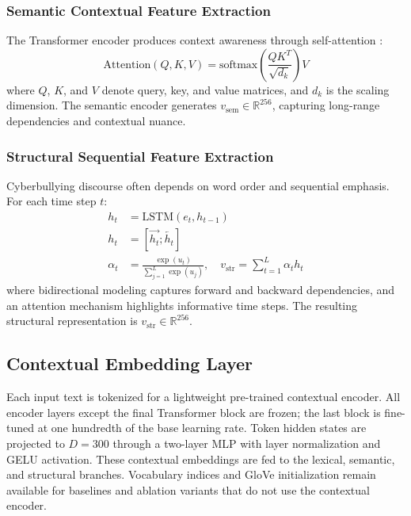 \subsubsection{Semantic Contextual Feature Extraction}

The Transformer encoder produces context awareness through self-attention \cite{ref9}:
\begin{equation}
\mathrm{Attention}(Q,K,V) = \mathrm{softmax}\!\left(\frac{QK^T}{\sqrt{d_k}}\right)V
\end{equation}
where $Q$, $K$, and $V$ denote query, key, and value matrices, and $d_k$ is the scaling dimension. The semantic encoder generates $v_{\mathrm{sem}} \in \mathbb{R}^{256}$, capturing long-range dependencies and contextual nuance.

\subsubsection{Structural Sequential Feature Extraction}

Cyberbullying discourse often depends on word order and sequential emphasis. For each time step $t$:
\begin{equation}
\begin{aligned}
h_t &= \mathrm{LSTM}(e_t, h_{t-1}) \\
h_t &= [\overrightarrow{h_t}; \overleftarrow{h_t}] \\
\alpha_t &= \frac{\exp(u_t)}{\sum_{j=1}^{L} \exp(u_j)}, \quad
v_{\mathrm{str}} = \sum_{t=1}^{L} \alpha_t h_t
\end{aligned}
\end{equation}
where bidirectional modeling captures forward and backward dependencies, and an attention mechanism \cite{ref30} highlights informative time steps. The resulting structural representation is $v_{\mathrm{str}} \in \mathbb{R}^{256}$.

\subsection{Contextual Embedding Layer}

Each input text is tokenized for a lightweight pre-trained contextual encoder. All encoder layers except the final Transformer block are frozen; the last block is fine-tuned at one hundredth of the base learning rate. Token hidden states are projected to $D=300$ through a two-layer MLP with layer normalization and GELU activation. These contextual embeddings are fed to the lexical, semantic, and structural branches. Vocabulary indices and GloVe initialization remain available for baselines and ablation variants that do not use the contextual encoder.

